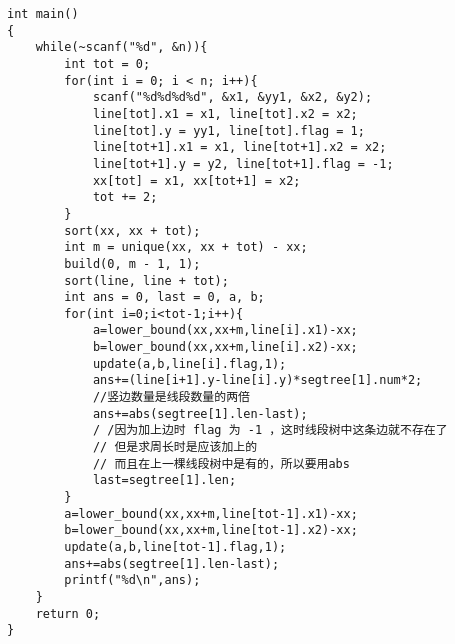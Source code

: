 \begin{lstlisting}
int main()
{
    while(~scanf("%d", &n)){
        int tot = 0;
        for(int i = 0; i < n; i++){
            scanf("%d%d%d%d", &x1, &yy1, &x2, &y2);
            line[tot].x1 = x1, line[tot].x2 = x2;
            line[tot].y = yy1, line[tot].flag = 1;
            line[tot+1].x1 = x1, line[tot+1].x2 = x2;
            line[tot+1].y = y2, line[tot+1].flag = -1;
            xx[tot] = x1, xx[tot+1] = x2;
            tot += 2;
        }
        sort(xx, xx + tot);
        int m = unique(xx, xx + tot) - xx;
        build(0, m - 1, 1);
        sort(line, line + tot);
        int ans = 0, last = 0, a, b;
        for(int i=0;i<tot-1;i++){
            a=lower_bound(xx,xx+m,line[i].x1)-xx;
            b=lower_bound(xx,xx+m,line[i].x2)-xx;
            update(a,b,line[i].flag,1);
            ans+=(line[i+1].y-line[i].y)*segtree[1].num*2;
            //竖边数量是线段数量的两倍
            ans+=abs(segtree[1].len-last);
            / /因为加上边时 flag 为 -1 ，这时线段树中这条边就不存在了
            // 但是求周长时是应该加上的
            // 而且在上一棵线段树中是有的，所以要用abs
            last=segtree[1].len;
        }
        a=lower_bound(xx,xx+m,line[tot-1].x1)-xx;
        b=lower_bound(xx,xx+m,line[tot-1].x2)-xx;
        update(a,b,line[tot-1].flag,1);
        ans+=abs(segtree[1].len-last);
        printf("%d\n",ans);
    }
    return 0;
}
\end{lstlisting}

